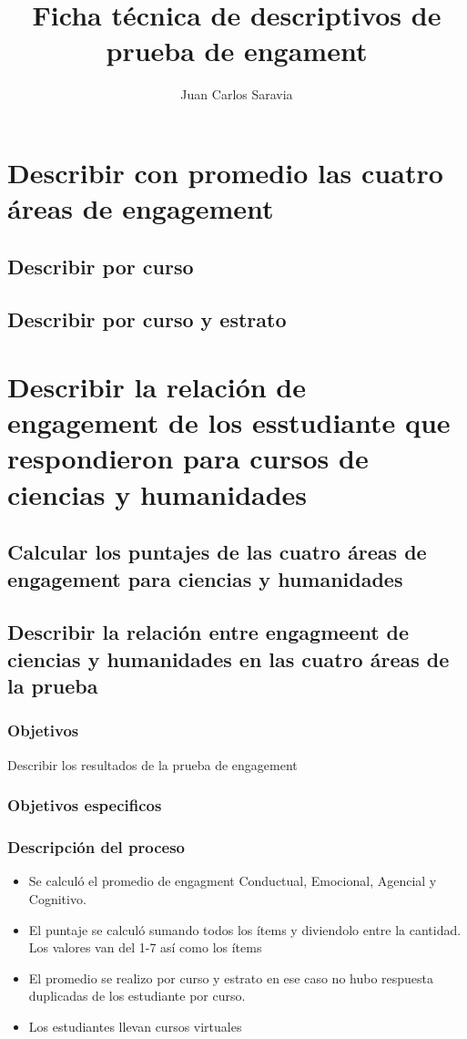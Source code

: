 \documentclass{beamer}
\title{Ficha técnica de descriptivos de prueba de engament}
\author{Juan Carlos Saravia}
\date{}
\begin{document}
\begin{frame}
\titlepage
\end{frame}

\section{Describir con promedio las cuatro áreas de engagement}
\subsection{Describir por curso}
\subsection{Describir por curso y estrato}

\section{Describir la relación de engagement de los esstudiante que respondieron para cursos de ciencias y humanidades}
\subsection{Calcular los puntajes de las cuatro áreas de engagement para ciencias y humanidades}
\subsection{Describir la relación entre engagmeent de ciencias y humanidades en las cuatro áreas de la prueba}



\begin{frame}
\frametitle{Objetivos}
Describir los resultados de la prueba de engagement 
\end{frame}

\begin{frame}
\frametitle{Objetivos especificos}
\tableofcontents
\end{frame}



\begin{frame}
\frametitle{Descripción del proceso}
\begin{itemize}
	\item Se calculó el promedio de engagment Conductual, Emocional, Agencial y Cognitivo. 
	\item El puntaje se calculó sumando todos los ítems y diviendolo entre la cantidad. Los valores van del 1-7 así como los ítems
	\item El promedio se realizo por curso y estrato en ese caso no hubo respuesta duplicadas de los estudiante por curso. 
	\item Los estudiantes llevan cursos virtuales 
\end{itemize}
\end{frame}	
\end{document}
